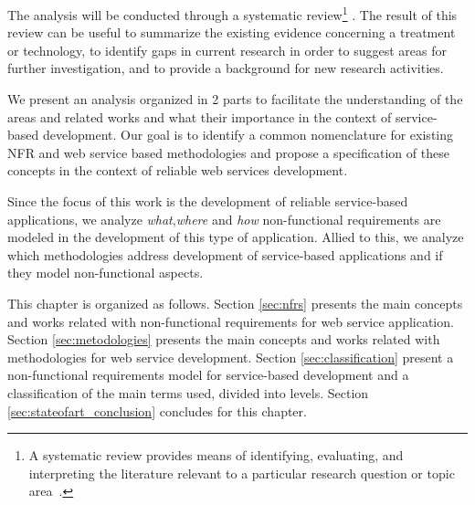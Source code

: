  
The analysis will be conducted through a systematic review\footnote{A systematic review provides means of identifying,
 evaluating, and interpreting the literature relevant to a particular research
 question or topic area~\cite{Kitchenham08}.} \cite{Kitchenham08}.
 The result of this review can be useful to summarize the existing evidence
 concerning a treatment or technology, to identify gaps in current research in
 order to suggest areas for further investigation, and to provide a background
 for new research activities.
 
 We present an analysis organized in 2 parts to facilitate the understanding of
 the areas and related works and what their importance in the context of
 service-based development.  Our goal is to identify a common nomenclature for existing NFR
 and web service based methodologies and propose a specification of these
 concepts in the context of reliable web services development. 
 
 Since the focus of this work is the development of reliable service-based
   applications, we analyze \textit{what},\textit{where} and \textit{how}
   non-functional requirements are modeled in the development of this type of application. Allied to this,
   we analyze which methodologies address development of service-based
   applications and if they model non-functional aspects.
 
 This chapter is organized as follows. Section \ref{sec:nfrs} presents the
 main concepts and works related with non-functional requirements for web service
 application. Section \ref{sec:metodologies} presents the main concepts and
 works related with methodologies for web service development. 
 Section \ref{sec:classification} present a non-functional requirements model for 
 service-based development and a classification of the main terms used, divided
 into levels. Section \ref{sec:stateofart_conclusion} concludes for this
 chapter.


   


